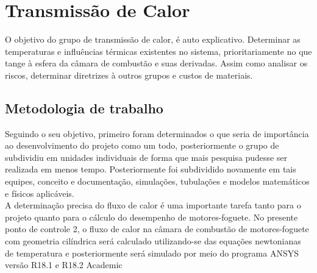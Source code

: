 \section{Transmissão de Calor}

O objetivo do grupo de transmissão de calor, é auto explicativo. Determinar as
temperaturas e influências térmicas existentes no sistema, prioritariamente no que tange à esfera
da câmara de combustão e suas derivadas. Assim como analisar os riscos, determinar diretrizes à
outros grupos e custos de materiais.

\subsection{Metodologia de trabalho}

Seguindo o seu objetivo, primeiro foram determinados o que seria de importância ao
desenvolvimento do projeto como um todo, posteriormente o grupo de subdividiu em unidades
individuais de forma que mais pesquisa pudesse ser realizada em menos tempo. Posteriormente
foi subdividido novamente em tais equipes, conceito e documentação, simulações, tubulações e
modelos matemáticos e físicos aplicáveis.\\
A determinação precisa do fluxo de calor é uma importante tarefa tanto para o projeto
quanto para o cálculo do desempenho de motores-foguete. No presente ponto de controle 2, o
fluxo de calor na câmara de combustão de motores-foguete com geometria cilíndrica será
calculado utilizando-se das equações newtonianas de temperatura e posteriormente será
simulado por meio do programa ANSYS versão R18.1 e R18.2 Academic


